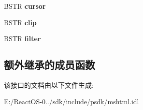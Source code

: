 \begin{DoxyCompactItemize}
B\+S\+TR {\bfseries cursor}
\item 
\mbox{\label{interface_m_s_h_t_m_l_1_1_i_h_t_m_l_style_af34d6bdacfce24eca5987c3748b3437d}} 
B\+S\+TR {\bfseries clip}
\item 
\mbox{\label{interface_m_s_h_t_m_l_1_1_i_h_t_m_l_style_af7dd058c8a13affd2781f200633c786e}} 
B\+S\+TR {\bfseries filter}
\end{DoxyCompactItemize}
\subsection*{额外继承的成员函数}


该接口的文档由以下文件生成\+:\begin{DoxyCompactItemize}
\item 
E\+:/\+React\+O\+S-\/0../sdk/include/psdk/mshtml.\+idl\end{DoxyCompactItemize}

